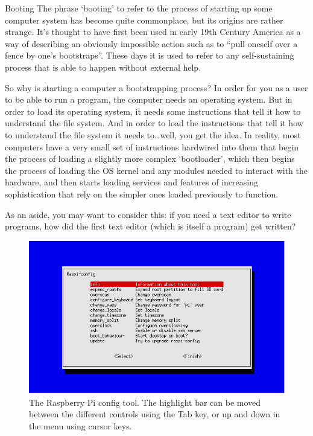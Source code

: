 \begin{diversion}{Booting}
\label{bootbox}
The phrase `booting' to refer to the process of starting up some computer system has become quite commonplace, but its origins are rather strange. It's thought to have first been used in early 19th Century America as a way of describing an obviously impossible action such as to ``pull oneself over a fence by one's bootstraps''. These days it is used to refer to any self-sustaining process that is able to happen without external help. 

So why is starting a computer a bootstrapping process? In order for you as a user to be able to run a program, the computer needs an operating system. But in order to load its operating system, it needs some instructions that tell it how to understand the file system. And in order to load the instructions that tell it how to understand the file system it needs to\ldots well, you get the idea. In reality, most computers have a very small set of instructions hardwired into them that begin the process of loading a  slightly more complex `bootloader', which then begins the process of loading the OS kernel and any modules needed to interact with the hardware, and then starts loading services and features of increasing sophistication that rely on the simpler ones loaded previously to function. 

As an aside, you may want to consider this: if you need a text editor to write programs, how did the first text editor (which is itself a program) get written?
\end{diversion}

\begin{figure}
\centerline{\includegraphics[width=13cm]{images/raspi-config.png}}
\caption{The Raspberry Pi config tool. The highlight bar can be moved between the different controls using the Tab key, or up and down in the menu using cursor keys.}\label{figure:raspi-config}
\end{figure}

